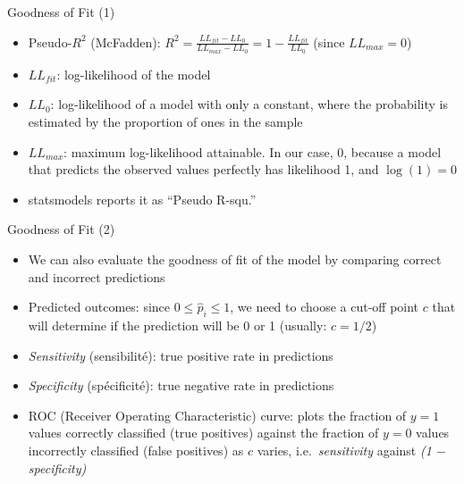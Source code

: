 \documentclass[aspectratio=169]{beamer}
\begin{document}
\begin{frame}{Goodness of Fit (1)}
\begin{itemize}
    \item Pseudo-$R^2$ (McFadden): $R^2 = \frac{LL_{fit} - LL_0}{LL_{max} - LL_0} = 1 - \frac{LL_{fit}}{LL_0}$ (since $LL_{max} = 0$)
    \item $LL_{fit}$: log-likelihood of the model
    \item $LL_0$: log-likelihood of a model with only a constant, where the probability is estimated by the proportion of ones in the sample
    \item $LL_{max}$: maximum log-likelihood attainable. In our case, 0, because a model that predicts the observed values perfectly has likelihood 1, and $\log(1) = 0$
    \item statsmodels reports it as ``Pseudo R-squ.''
\end{itemize}
\end{frame}

\begin{frame}{Goodness of Fit (2)}
\begin{itemize}
    \item We can also evaluate the goodness of fit of the model by comparing correct and incorrect predictions
    \item Predicted outcomes: since $0 \leq \hat{p}_i \leq 1$, we need to choose a cut-off point $c$ that will determine if the prediction will be 0 or 1 (usually: $c = 1/2$)
    \item \textit{Sensitivity} (sensibilité): true positive rate in predictions
    \item \textit{Specificity} (spécificité): true negative rate in predictions
    \item ROC (Receiver Operating Characteristic) curve: plots the fraction of $y = 1$ values correctly classified (true positives) against the fraction of $y = 0$ values incorrectly classified (false positives) as $c$ varies, i.e.\ \textit{sensitivity} against \textit{(1 $-$ specificity)}
\end{itemize}
\end{frame}
\end{document}
